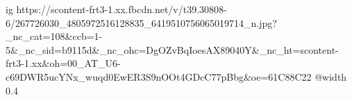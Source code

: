  
 
 
 
 

\ifcmt
  ig https://scontent-frt3-1.xx.fbcdn.net/v/t39.30808-6/267726030_4805972516128835_6419510756065019714_n.jpg?_nc_cat=108&ccb=1-5&_nc_sid=b9115d&_nc_ohc=DgOZvBqIoesAX89040Y&_nc_ht=scontent-frt3-1.xx&oh=00_AT_U6-c69DWR5ucYNx_wuqd0EwER3S9nOOt4GDcC77pBbg&oe=61C88C22
  @width 0.4
\fi
